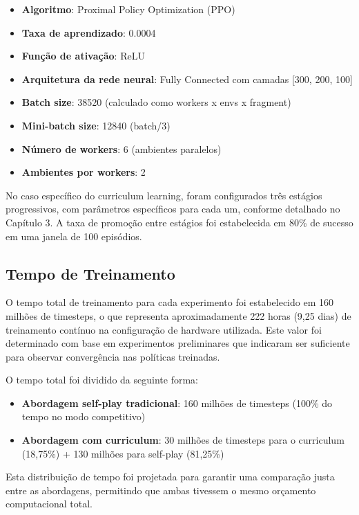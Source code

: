 \begin{itemize}
    \item \textbf{Algoritmo}: Proximal Policy Optimization (PPO)
    \item \textbf{Taxa de aprendizado}: 0.0004
    \item \textbf{Função de ativação}: ReLU
    \item \textbf{Arquitetura da rede neural}: Fully Connected com camadas [300, 200, 100]
    \item \textbf{Batch size}: 38520 (calculado como workers x envs x fragment)
    \item \textbf{Mini-batch size}: 12840 (batch/3)
    \item \textbf{Número de workers}: 6 (ambientes paralelos)
    \item \textbf{Ambientes por workers}: 2
\end{itemize}

No caso específico do curriculum learning, foram configurados três estágios progressivos, com parâmetros específicos para cada um, conforme detalhado no Capítulo 3. A taxa de promoção entre estágios foi estabelecida em 80\% de sucesso em uma janela de 100 episódios.

\subsection{Tempo de Treinamento}

O tempo total de treinamento para cada experimento foi estabelecido em 160 milhões de timesteps, o que representa aproximadamente 222 horas (9,25 dias) de treinamento contínuo na configuração de hardware utilizada. Este valor foi determinado com base em experimentos preliminares que indicaram ser suficiente para observar convergência nas políticas treinadas.

O tempo total foi dividido da seguinte forma:

\begin{itemize}
    \item \textbf{Abordagem self-play tradicional}: 160 milhões de timesteps (100\% do tempo no modo competitivo)
    \item \textbf{Abordagem com curriculum}: 30 milhões de timesteps para o curriculum (18,75\%) + 130 milhões para self-play (81,25\%)
\end{itemize}

Esta distribuição de tempo foi projetada para garantir uma comparação justa entre as abordagens, permitindo que ambas tivessem o mesmo orçamento computacional total.

